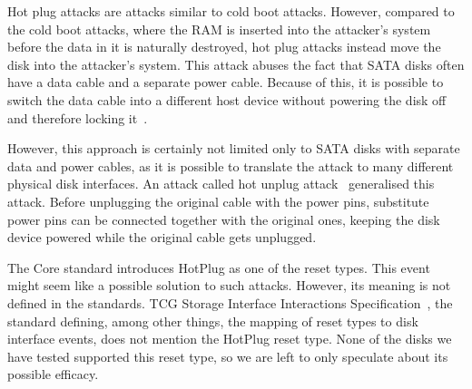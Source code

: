 Hot plug attacks are attacks similar to cold boot attacks. However, compared to the cold boot attacks, where the RAM is inserted into the attacker's system before the data in it is naturally destroyed, hot plug attacks instead move the disk into the attacker's system. This attack abuses the fact that SATA disks often have a data cable and a separate power cable. Because of this, it is possible to switch the data cable into a different host device without powering the disk off and therefore locking it~\cite{self_decrypting_risks}. 

However, this approach is certainly not limited only to SATA disks with separate data and power cables, as it is possible to translate the attack to many different physical disk interfaces. An attack called hot unplug attack~\cite{bypassing_in_enterprise} generalised this attack. 
Before unplugging the original cable with the power pins, substitute power pins can be connected together with the original ones, keeping the disk device powered while the original cable gets unplugged. 


\REPLACEME

The Core standard introduces HotPlug as one of the reset types. This event might seem like a possible solution to such attacks. However,  its meaning is not defined in the standards. TCG Storage Interface Interactions Specification~\cite{tcg-siis}, the standard defining, among other things, the mapping of reset types to disk interface events, does not mention the HotPlug reset type. None of the disks we have tested supported this reset type, so we are left to only speculate about its possible efficacy.






